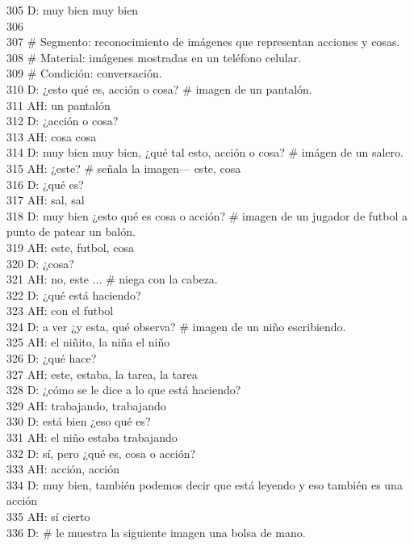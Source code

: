 305 D: muy bien muy bien\\
306 \\
307 \# Segmento:  reconocimiento de imágenes que representan acciones y cosas.\\
308 \# Material: imágenes mostradas en un teléfono celular.\\
309 \# Condición: conversación.\\
310 D: ¿esto qué es, acción o cosa? \# imagen de un pantalón.\\
311 AH: un pantalón\\
312 D: ¿acción o cosa?\\
313 AH: cosa cosa\\
314 D: muy bien muy bien, ¿qué tal esto, acción o cosa? \# imágen de un salero.\\
315 AH: ¿este? \# señala la imagen--- este, cosa\\
316 D: ¿qué es?\\
317 AH: sal, sal\\
318 D: muy bien ¿esto qué es cosa o acción? \# imagen de un jugador de futbol a punto de patear un balón.\\
319 AH: este, futbol, cosa\\
320 D: ¿cosa?\\
321 AH: no, este ... \# niega con la cabeza.\\
322 D: ¿qué está haciendo?\\
323 AH: con el futbol\\
324 D: a ver ¿y esta, qué observa? \# imagen de un niño escribiendo.\\
325 AH: el niñito, la niña el niño\\
326 D: ¿qué hace?\\
327 AH: este, estaba, la tarea, la tarea\\
328 D: ¿cómo se le dice a lo que está haciendo?\\
329 AH: trabajando, trabajando\\
330 D: está bien ¿eso qué es?\\
331 AH: el niño estaba trabajando\\
332 D: sí, pero ¿qué es, cosa o acción?\\
333 AH: acción, acción\\
334 D: muy bien, también podemos decir que está leyendo y eso también es una acción\\
335 AH: sí cierto\\
336 D: \# le muestra la siguiente imagen una bolsa de mano.\\
